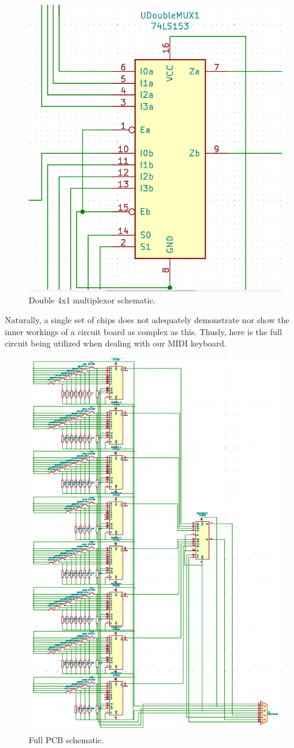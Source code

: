 \begin{figure}[h!]
  \centering
  \includegraphics[width=\linewidth]{image/doublefourtoonemultiplexor.png}
  \caption{Double 4x1 multiplexor schematic.}
\end{figure}

Naturally, a single set of chips does not adequately demonstrate nor show the inner
workings of a circuit board as complex as this. Thusly, here is the full circuit being
utilized when dealing with our MIDI keyboard.

\begin{figure}[h!]
  \centering
  \includegraphics[width=0.5 \linewidth]{image/pcbschematic.png}
  \caption{Full PCB schematic.}
\end{figure}

